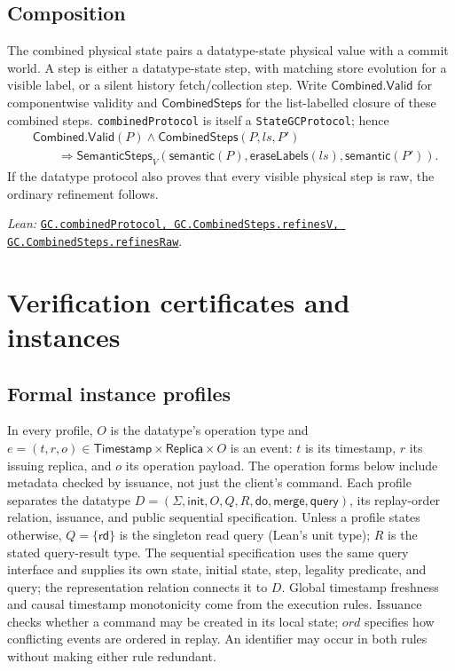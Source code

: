 \documentclass[11pt]{article}
\theoremstyle{definition}
\newcommand{\State}{\Sigma}
\newcommand{\Replica}{\mathsf{Replica}}
\newcommand{\Time}{\mathsf{Timestamp}}
\newcommand{\doop}{\mathsf{do}}
\newcommand{\merge}{\mathsf{merge}}
\newcommand{\lean}[1]{\texttt{#1}}
\newcommand{\src}[2]{\href{../../#1}{\texttt{#2}}}
\newcommand{\anchor}[2]{\par\smallskip\noindent\emph{Lean: }\src{#1}{#2}.}
\begin{document}
\subsection{Composition}

The combined physical state pairs a datatype-state physical value with a
commit world. A step is either a datatype-state step, with matching store
evolution for a visible label, or a silent history fetch/collection step.
Write $\mathsf{Combined.Valid}$ for componentwise validity and
$\mathsf{CombinedSteps}$ for the list-labelled closure of these combined
steps. \lean{combinedProtocol} is itself a \lean{StateGCProtocol}; hence
\[
\begin{aligned}
 &\mathsf{Combined.Valid}(P)\land
 \mathsf{CombinedSteps}(P,ls,P')\\
 &\qquad\Longrightarrow
 \mathsf{SemanticSteps}_V
 (\mathsf{semantic}(P),\mathsf{eraseLabels}(ls),\mathsf{semantic}(P')).
\end{aligned}
\]
If the datatype protocol also proves that every visible physical step is raw,
the ordinary refinement follows.
\anchor{Sal/MRDTs/GC/StateComposition.lean}
  {GC.combinedProtocol, GC.CombinedSteps.refinesV, GC.CombinedSteps.refinesRaw}

\section{Verification certificates and instances}
\label{sec:instances}

\subsection{Formal instance profiles}
\label{sec:instance-profiles}

In every profile, $O$ is the datatype's operation type and
$e=(t,r,o)\in\Time\times\Replica\times O$ is an event: $t$ is its timestamp,
$r$ its issuing replica, and $o$ its operation payload. The operation forms
below include metadata checked by issuance, not just the client's command.
Each profile separates the datatype $D=(\State,\mathsf{init},O,Q,R,\doop,
\merge,\mathsf{query})$, its replay-order relation, issuance, and public
sequential specification. Unless a profile states otherwise, $Q=\{\mathsf{rd}\}$
is the singleton read query (Lean's unit type); $R$ is the stated query-result
type. The sequential specification
uses the same query interface and supplies its own state, initial state, step,
legality predicate, and query; the representation relation connects it to $D$.
Global timestamp freshness and causal timestamp monotonicity come from the
execution rules. Issuance checks whether a command may be created in its
local state; $ord$ specifies how conflicting events are ordered in replay.
An identifier may occur in both rules without making either rule redundant.
\end{document}

